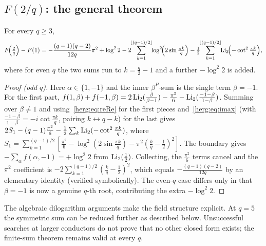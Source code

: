 \subsection{$F(2/q)$: the general theorem}
\begin{theorem}\label{herg:thm:F2q}
For every $q\ge3$,
\[
  F\!\Bigl(\tfrac2q\Bigr)-F(1)=-\frac{(q-1)(q-2)}{12q}\pi^2+\log^2 2
  -2\!\!\sum_{k=1}^{\lfloor(q-1)/2\rfloor}\!\!\log^2\!\Bigl(2\sin\tfrac{\pi k}{q}\Bigr)
  -\tfrac12\!\!\sum_{k=1}^{\lfloor(q-1)/2\rfloor}\!\!\Li_2\!\Bigl(-\cot^2\tfrac{\pi k}{q}\Bigr),
\]
where for even $q$ the two sums run to $k=\tfrac q2-1$ and a further $-\log^2 2$ is added.
\end{theorem}
\begin{proof}[Proof (odd $q$)]
Here $\alpha\in\{1,-1\}$ and the inner $\beta^P$-sum is the single term $\beta=-1$. For the first part,
$f(1,\beta)+f(-1,\beta)=2\operatorname{Li}_2(\tfrac{\beta}{\beta-1})-\tfrac{\pi^2}{6}-\operatorname{Li}_2(\tfrac{-1-\beta}{1-\beta})$.
Summing over $\beta\neq1$ and using~\eqref{herg:eq:reRe} for the first pieces and~\eqref{herg:eq:imax}
(with $\tfrac{-1-\beta}{1-\beta}=-i\cot\tfrac{\pi k}q$, pairing $k\leftrightarrow q-k$) for the last gives
$2S_1-(q-1)\tfrac{\pi^2}{6}-\tfrac12\sum_{k}\operatorname{Li}_2(-\cot^2\tfrac{\pi k}q)$, where
$S_1=\sum_{k=1}^{(q-1)/2}[\tfrac{\pi^2}{6}-\log^2(2\sin\tfrac{\pi k}q)-\pi^2(\tfrac kq-\tfrac12)^2]$. The boundary
gives $-\sum_\alpha f(\alpha,-1)=+\log^2 2$ from $\operatorname{Li}_2(\tfrac12)$. Collecting, the $\tfrac{\pi^2}{6}$ terms
cancel and the $\pi^2$ coefficient is $-2\sum_{k=1}^{(q-1)/2}(\tfrac kq-\tfrac12)^2$, which equals
$-\tfrac{(q-1)(q-2)}{12q}$ by an elementary identity (verified symbolically). The even-$q$ case differs only
in that $\beta=-1$ is now a genuine $q$-th root, contributing the extra $-\log^2 2$.
\end{proof}
The algebraic dilogarithm arguments make the field structure explicit.
At $q=5$ the symmetric sum can be reduced further as described below.
Unsuccessful searches at larger conductors do not prove that no other
closed form exists; the finite-sum theorem remains valid at every $q$.

